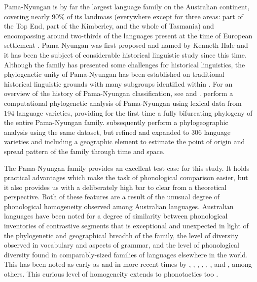 Pama-Nyungan is by far the largest language family on the Australian continent, covering nearly 90\% of its landmass (everywhere except for three areas: part of the Top End, part of the Kimberley, and the whole of Tasmania) and encompassing around two-thirds of the languages present at the time of European settlement \autocite[p.~817]{bowern_computational_2012}. Pama-Nyungan was first proposed and named by Kenneth Hale \autocite[p.~136]{wurm_aboriginal_1963} and it has been the subject of considerable historical linguistic study since this time. Although the family has presented some challenges for historical linguistics, the phylogenetic unity of Pama-Nyungan has been established on traditional historical linguistic grounds \autocite{alpher_pama-nyungan:_2004} with many subgroups identified within \autocites[for example,][]{ogrady_languages_1966}{wurm_languages_1972}{austin_proto-kanyara_1981}. For an overview of the history of Pama-Nyungan classification, see \textcite[ch.~1--5]{bowern_australian_2004} and \textcite{koch_historical_2014}. \textcite{bowern_computational_2012} perform a computational phylogenetic analysis of Pama-Nyungan using lexical data from 194 language varieties, providing for the first time a fully bifurcating phylogeny of the entire Pama-Nyungan family. \textcite{bouckaert_origin_2018} subsequently perform a phylogeographic analysis using the same dataset, but refined and expanded to 306 language varieties and including a geographic element to estimate the point of origin and spread pattern of the family through time and space.

The Pama-Nyungan family provides an excellent test case for this study. It holds practical advantages which make the task of phonological comparison easier, but it also provides us with a deliberately high bar to clear from a theoretical perspective. Both of these features are a result of the unusual degree of phonological homogeneity observed among Australian languages. Australian languages have been noted for a degree of similarity between phonological inventories of contrastive segments that is exceptional and unexpected in light of the phylogenetic and geographical breadth of the family, the level of diversity observed in vocabulary and aspects of grammar, and the level of phonological diversity found in comparably-sized families of languages elsewhere in the world. This has been noted as early as \textcite{schmidt_gliederung_1919} and in more recent times by \textcite{capell_new_1956}, \textcite{voegelin_obtaining_1963}, \textcite{dixon_languages_1980}, \textcite{busby_distribution_1982}, \textcite{hamilton_phonetic_1996}, \textcite{baker_word_2014}, \textcite{bowern_standard_2017} and \textcite{round_segment_2020}, among others. This curious level of homogeneity extends to phonotactics too \autocites{dixon_languages_1980}{hamilton_phonetic_1996}{baker_word_2014}{round_phonotactics_2020}.

